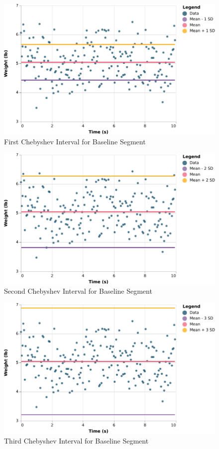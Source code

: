 \begin{figure} \label{figure.baseline.chebyshev.1}
    \centering
    \includegraphics{chart/00-intro/baseline-chebyshev-1.pdf}
    \caption{First Chebyshev Interval for Baseline Segment}
\end{figure}
\begin{figure} \label{figure.baseline.chebyshev.2}
    \centering
    \includegraphics{chart/00-intro/baseline-chebyshev-2.pdf}
    \caption{Second Chebyshev Interval for Baseline Segment}
\end{figure}
\begin{figure} \label{figure.baseline.chebyshev.3}
    \centering
    \includegraphics{chart/00-intro/baseline-chebyshev-3.pdf}
    \caption{Third Chebyshev Interval for Baseline Segment}
\end{figure}
